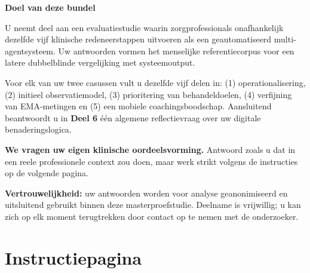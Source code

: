 \documentclass[11pt,a4paper]{article}
\begin{document}
\vspace{0.4cm}

\begin{center}
\begin{tcolorbox}[
  colback=SoftBG,colframe=BorderGrey,
  arc=2mm,left=10pt,right=10pt,top=9pt,bottom=9pt,
  width=0.92\textwidth
]
\textbf{\color{PrimaryBlue}Doel van deze bundel}

\medskip\small
U neemt deel aan een evaluatiestudie waarin zorgprofessionals onafhankelijk dezelfde
vijf klinische redeneerstappen uitvoeren als een geautomatiseerd multi-agentsysteem. Uw antwoorden
vormen het menselijke referentiecorpus voor een latere dubbelblinde vergelijking
met systeemoutput.

\smallskip
Voor elk van uw twee casussen vult u dezelfde vijf delen in: (1) operationalisering,
(2) initieel observatiemodel, (3) prioritering van behandeldoelen, (4) verfijning van
EMA-metingen en (5) een mobiele coachingsboodschap. Aansluitend beantwoordt u in
\textbf{Deel 6} één algemene reflectievraag over uw digitale benaderingslogica.

\smallskip
\textbf{We vragen uw eigen klinische oordeelsvorming.} Antwoord zoals u dat in een
reele professionele context zou doen, maar werk strikt volgens de instructies op de
volgende pagina.
\end{tcolorbox}
\end{center}

\vspace{0.4cm}

\begin{center}
\begin{tcolorbox}[
  colback=AccentAmber,colframe=GoldAmber,
  arc=2mm,boxrule=0.7pt,left=10pt,right=10pt,top=8pt,bottom=8pt,
  width=0.90\textwidth
]
\small\centering
\textbf{\color{GoldAmber}Vertrouwelijkheid:} uw antwoorden worden voor analyse
geanonimiseerd en uitsluitend gebruikt binnen deze masterproefstudie. Deelname is
vrijwillig; u kan zich op elk moment terugtrekken door contact op te nemen met de
onderzoeker.
\end{tcolorbox}
\end{center}

\vfill
\newpage
\tableofcontents
\newpage


\section{Instructiepagina}
\end{document}
